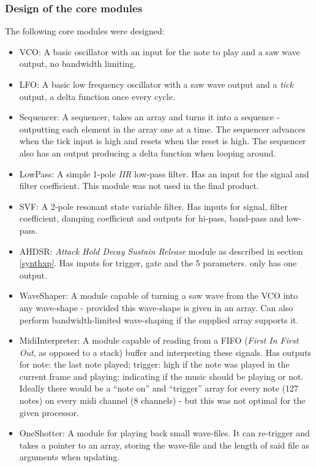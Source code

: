 \subsubsection{Design of the core modules}
The following core modules were designed:
\begin{itemize}
  \item VCO: A basic oscillator with an input for the note to play and a saw
  wave output, no bandwidth limiting.
  \item LFO: A basic low frequency oscillator with a saw wave output and a
  \emph{tick} output, a delta function once every cycle.
  \item Sequencer: A sequencer, takes an array and turns it into a sequence -
  outputting each element in the array one at a time. The sequencer advances
  when the tick input is high and resets when the reset is high. The sequencer
  also has an output producing a delta function when looping around.
  \item LowPass: A simple 1-pole \emph{IIR} low-pass filter. Has an input for
  the signal and filter coefficient. This module was not used in the final product.
  \item SVF: A 2-pole resonant state variable filter. Has inputs for signal,
  filter coefficient, damping coefficient and outputs for hi-pass, band-pass and
  low-pass.
  \item AHDSR: \emph{Attack Hold Decay Sustain Release} module as described in
  section \ref{synthxp}. Has inputs for trigger, gate and the 5 parameters. only
  has one output.
  \item WaveShaper: A module capable of turning a saw wave from the VCO into any
  wave-shape - provided this wave-shape is given in an array. Can also perform
  bandwidth-limited wave-shaping if the supplied array supports it.
  \item MidiInterpreter: A module capable of reading from a FIFO (\emph{First
  In First Out}, as opposed to a stack) buffer and interpreting these signals.
  Has outputs for note: the last note played; trigger: high if the note was
  played in the current frame and playing: indicating if the music should be
  playing or not. Ideally there would be a ``note on'' and ``trigger'' array for
  every note (127 notes) on every midi channel (8 channels) - but this was not
  optimal for the given processor.
  \item OneShotter: A module for playing back small wave-files. It can
  re-trigger and takes a pointer to an array, storing the wave-file and the
  length of said file as arguments when updating.
  
  
\end{itemize}

